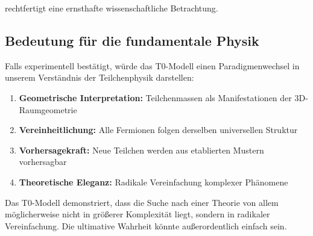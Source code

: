 \documentclass[12pt,a4paper]{article}
\begin{document}
	rechtfertigt eine ernsthafte wissenschaftliche Betrachtung.
	
	\subsection{Bedeutung für die fundamentale Physik}
	\label{subsec:bedeutung_physik}
	
	Falls experimentell bestätigt, würde das T0-Modell einen Paradigmenwechsel in unserem Verständnis der Teilchenphysik darstellen:
	
	\begin{enumerate}
		\item \textbf{Geometrische Interpretation:} Teilchenmassen als Manifestationen der 3D-Raumgeometrie
		\item \textbf{Vereinheitlichung:} Alle Fermionen folgen derselben universellen Struktur
		\item \textbf{Vorhersagekraft:} Neue Teilchen werden aus etablierten Mustern vorhersagbar
		\item \textbf{Theoretische Eleganz:} Radikale Vereinfachung komplexer Phänomene
	\end{enumerate}
	
	Das T0-Modell demonstriert, dass die Suche nach einer Theorie von allem möglicherweise nicht in größerer Komplexität liegt, sondern in radikaler Vereinfachung. Die ultimative Wahrheit könnte außerordentlich einfach sein.
	
\end{document}
